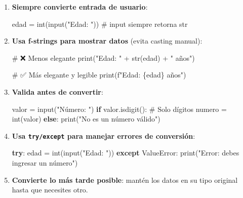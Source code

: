 \documentclass[
  doc,
  floatsintext,
  longtable,
  a4paper,
  nolmodern,
  notxfonts,
  notimes,
  12pt,
  colorlinks=true,linkcolor=blue,citecolor=blue,urlcolor=blue]{apa7}
\newenvironment{Shaded}{\begin{snugshade}}{\end{snugshade}}
\newcommand{\BuiltInTok}[1]{\textcolor[rgb]{0.00,0.23,0.31}{#1}}
\newcommand{\CommentTok}[1]{\textcolor[rgb]{0.37,0.37,0.37}{#1}}
\newcommand{\ControlFlowTok}[1]{\textcolor[rgb]{0.00,0.23,0.31}{\textbf{#1}}}
\newcommand{\NormalTok}[1]{\textcolor[rgb]{0.00,0.23,0.31}{#1}}
\newcommand{\OperatorTok}[1]{\textcolor[rgb]{0.37,0.37,0.37}{#1}}
\newcommand{\PreprocessorTok}[1]{\textcolor[rgb]{0.68,0.00,0.00}{#1}}
\newcommand{\SpecialCharTok}[1]{\textcolor[rgb]{0.37,0.37,0.37}{#1}}
\newcommand{\SpecialStringTok}[1]{\textcolor[rgb]{0.13,0.47,0.30}{#1}}
\newcommand{\StringTok}[1]{\textcolor[rgb]{0.13,0.47,0.30}{#1}}
\begin{document}
\begin{enumerate}
\def\labelenumi{\arabic{enumi}.}
\item
  \textbf{Siempre convierte entrada de usuario}:

\begin{Shaded}
\begin{Highlighting}[]
\NormalTok{edad }\OperatorTok{=} \BuiltInTok{int}\NormalTok{(}\BuiltInTok{input}\NormalTok{(}\StringTok{"Edad: "}\NormalTok{))  }\CommentTok{\# input siempre retorna str}
\end{Highlighting}
\end{Shaded}
\item
  \textbf{Usa f-strings para mostrar datos} (evita casting manual):

\begin{Shaded}
\begin{Highlighting}[]
\CommentTok{\# ❌ Menos elegante}
\BuiltInTok{print}\NormalTok{(}\StringTok{"Edad: "} \OperatorTok{+} \BuiltInTok{str}\NormalTok{(edad) }\OperatorTok{+} \StringTok{" años"}\NormalTok{)}

\CommentTok{\# ✅ Más elegante y legible}
\BuiltInTok{print}\NormalTok{(}\SpecialStringTok{f"Edad: }\SpecialCharTok{\{}\NormalTok{edad}\SpecialCharTok{\}}\SpecialStringTok{ años"}\NormalTok{)}
\end{Highlighting}
\end{Shaded}
\item
  \textbf{Valida antes de convertir}:

\begin{Shaded}
\begin{Highlighting}[]
\NormalTok{valor }\OperatorTok{=} \BuiltInTok{input}\NormalTok{(}\StringTok{"Número: "}\NormalTok{)}
\ControlFlowTok{if}\NormalTok{ valor.isdigit():  }\CommentTok{\# Solo dígitos}
\NormalTok{    numero }\OperatorTok{=} \BuiltInTok{int}\NormalTok{(valor)}
\ControlFlowTok{else}\NormalTok{:}
    \BuiltInTok{print}\NormalTok{(}\StringTok{"No es un número válido"}\NormalTok{)}
\end{Highlighting}
\end{Shaded}
\item
  \textbf{Usa \texttt{try/except} para manejar errores de conversión}:

\begin{Shaded}
\begin{Highlighting}[]
\ControlFlowTok{try}\NormalTok{:}
\NormalTok{    edad }\OperatorTok{=} \BuiltInTok{int}\NormalTok{(}\BuiltInTok{input}\NormalTok{(}\StringTok{"Edad: "}\NormalTok{))}
\ControlFlowTok{except} \PreprocessorTok{ValueError}\NormalTok{:}
    \BuiltInTok{print}\NormalTok{(}\StringTok{"Error: debes ingresar un número"}\NormalTok{)}
\end{Highlighting}
\end{Shaded}
\item
  \textbf{Convierte lo más tarde posible}: mantén los datos en su tipo
  original hasta que necesites otro.
\end{enumerate}
\end{document}
